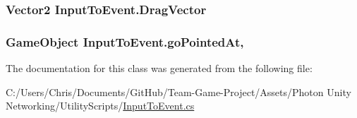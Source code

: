 \subsubsection[{\texorpdfstring{Drag\+Vector}{DragVector}}]{\setlength{\rightskip}{0pt plus 5cm}Vector2 Input\+To\+Event.\+Drag\+Vector\hspace{0.3cm}{\ttfamily [get]}}\hypertarget{class_input_to_event_a7a515661f0f9d2367a0e603cbed88592}{}\label{class_input_to_event_a7a515661f0f9d2367a0e603cbed88592}
\subsubsection[{\texorpdfstring{go\+Pointed\+At}{goPointedAt}}]{\setlength{\rightskip}{0pt plus 5cm}Game\+Object Input\+To\+Event.\+go\+Pointed\+At\hspace{0.3cm}{\ttfamily [static]}, {\ttfamily [get]}}\hypertarget{class_input_to_event_a174f9bb241e6abae04030a747fc50a51}{}\label{class_input_to_event_a174f9bb241e6abae04030a747fc50a51}


The documentation for this class was generated from the following file\+:\begin{DoxyCompactItemize}
\item 
C\+:/\+Users/\+Chris/\+Documents/\+Git\+Hub/\+Team-\/\+Game-\/\+Project/\+Assets/\+Photon Unity Networking/\+Utility\+Scripts/\hyperlink{_input_to_event_8cs}{Input\+To\+Event.\+cs}\end{DoxyCompactItemize}
